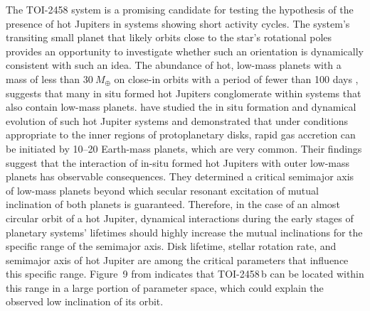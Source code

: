\documentclass[traditabstract,longauth]{aa}
\begin{document}
The TOI-2458 system is a promising candidate for testing the hypothesis of the presence of hot Jupiters in systems showing short activity cycles. The system's transiting small planet that likely orbits close to the star's rotational poles provides an opportunity to investigate whether such an orientation is dynamically consistent with such an idea. The abundance of hot, low-mass planets with a mass of less than $30~M_{\oplus}$ on close-in orbits with a period of fewer than 100 days \citep[e.g.,][]{Mulders15,Winn15}, suggests that many in situ formed hot Jupiters conglomerate within systems that also contain low-mass planets. \citet{Batygin16} have studied the in situ formation and dynamical evolution of such hot Jupiter systems and demonstrated that under conditions appropriate to the inner regions of protoplanetary disks, rapid gas accretion can be initiated by 10--20 Earth-mass planets, which are very common. Their findings suggest that the interaction of in-situ formed hot Jupiters with outer low-mass planets has observable consequences. They determined a critical semimajor axis of low-mass planets beyond which secular resonant excitation of mutual inclination of both planets is guaranteed. Therefore, in the case of an almost circular orbit of a hot Jupiter, dynamical interactions during the early stages of planetary systems' lifetimes should highly increase the mutual inclinations for the specific range of the semimajor axis. Disk lifetime, stellar rotation rate, and semimajor axis of hot Jupiter are among the critical parameters that influence this specific range. Figure~9 from \citet{Batygin16} indicates that TOI-2458\,b can be located within this range in a large portion of parameter space, which could explain the observed low inclination of its orbit.
\end{document}
